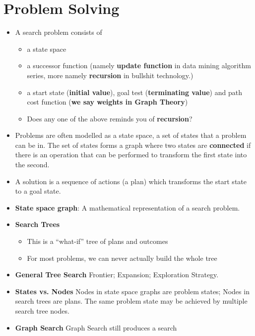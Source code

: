 \documentclass[twocolumn]{article}
\begin{document}
\section{Problem Solving}
\label{sec:problem-solving}

\begin{itemize}
\item A search problem consists of 
  \begin{itemize}
  \item a state space
  \item a successor function (namely \textbf{update function} in data
    mining algorithm series, more namely \textbf{recursion} in
    bullshit technology.)
  \item a start state (\textbf{initial value}), goal test
    (\textbf{terminating value}) and path cost function (\textbf{we
      say weights in Graph Theory})
  \item Does any one of the above reminds you of \textbf{recursion}?
  \end{itemize}
\item Problems are often modelled as a state space, a set of states
  that a problem can be in. The set of states forms a graph where two
  states are \textbf{connected} if there is an operation that can be
  performed to transform the first state into the second.
\item A solution is a sequence of actions (a plan) which transforms
  the start state to a goal state.
\item \textbf{State space graph}: A mathematical representation of a
  search problem.
\item \textbf{Search Trees} 
  \begin{itemize}
  \item This is a ``what-if'' tree of plans and outcomes
  \item For most problems, we can never actually build the whole tree
  \end{itemize}
\item \textbf{General Tree Search} Frontier; Expansion; Exploration
  Strategy.
\item \textbf{States vs. Nodes} Nodes in state space graphs are
  problem states; Nodes in search trees are plans. {\color{red}The same problem
  state may be achieved by multiple search tree nodes.}
\item \textbf{Graph Search} Graph Search still  produces a search

\end{itemize}
\end{document}
